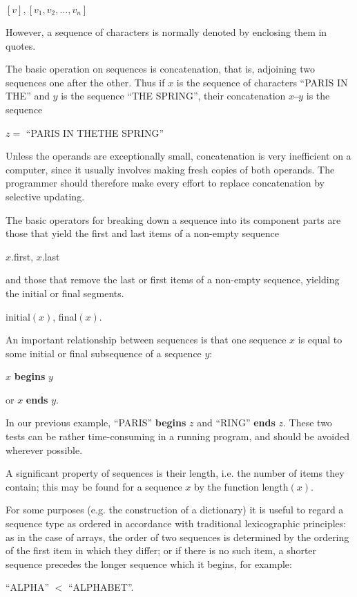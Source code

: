 \quad $[v],$\qquad $[v_1, v_2, \dots, v_n]$

\noindent
However, a sequence of characters is normally denoted by enclosing them in quotes.

The basic operation on sequences is concatenation, that is, adjoining two sequences one after the other. Thus if $x$ is the sequence of characters ``PARIS IN THE'' and $y$ is the sequence ``THE SPRING'', their concatenation $x\wideparen{\ \ }y$ is the sequence

\quad $z =$ ``PARIS IN THETHE SPRING''

\noindent
Unless the operands are exceptionally small, concatenation is very inefficient on a computer, since it usually involves making fresh copies of both operands. The programmer should therefore make every effort to replace concatenation by selective updating.

The basic operators for breaking down a sequence into its component parts are those that yield the first and last items of a non-empty sequence

\quad $x$.first, $x$.last

\noindent
and those that remove the last or first items of a non-empty sequence, yielding the initial or final segments.

\quad initial$(x)$, final$(x)$.

An important relationship between sequences is that one sequence $x$ is equal to some initial or final subsequence of a sequence $y$:

\quad $x$ \textbf{begins} $y$

\quad or $x$ \textbf{ends} $y$.

\noindent
In our previous example, ``PARIS'' \textbf{begins} $z$ and ``RING'' \textbf{ends} $z$. These two tests can be rather time-consuming in a running program, and should be avoided wherever possible.

A significant property of sequences is their length, i.e. the number of items they contain; this may be found for a sequence $x$ by the function length$(x)$.

For some purposes (e.g. the construction of a dictionary) it is useful to regard a sequence type as ordered in accordance with traditional lexicographic principles: as in the case of arrays, the order of two sequences is determined by the ordering of the first item in which they differ; or if there is no such item, a shorter sequence precedes the longer sequence which it begins, for example:

\quad ``ALPHA'' $<$ ``ALPHABET''.

